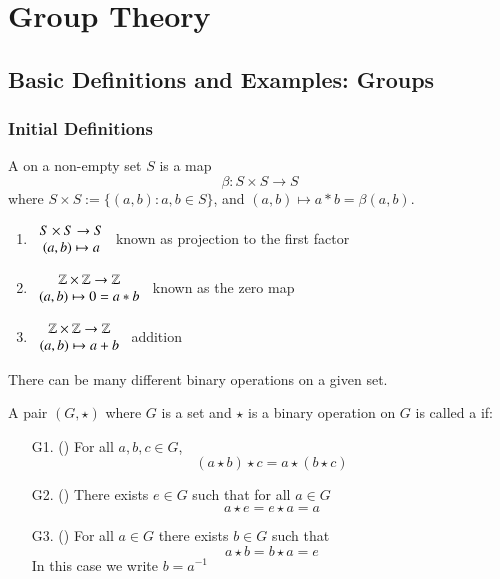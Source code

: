 \documentclass[12pt, a4paper, oneside, openright, titlepage]{book}
\begin{document}
\tableofcontents

\part{Group Theory}

\chapter{\textsection\textsection Basic Definitions and Examples: Groups}

\section{\textsection Initial Definitions}

\begin{defn}
    A  on a non-empty set $S$ is a map $$\beta:S\times S\rightarrow S$$ where $S\times S := \{(a,b): a,b \in S\}$, and $(a,b)\mapsto a*b = \beta(a,b)$.
\end{defn}

\begin{eg}
    \leavevmode
    \begin{enumerate}
        \item $\begin{array}{c} S\times S\rightarrow S \\ (a,b)\mapsto a \end{array}$ known as projection to the first factor
        \item $\begin{array}{c} \mathbb Z\times \mathbb Z\rightarrow \mathbb Z \\ (a,b)\mapsto 0 = a*b \end{array}$ known as the zero map
        \item $\begin{array}{c} \mathbb Z\times \mathbb Z\rightarrow \mathbb Z \\ (a,b)\mapsto a+b \end{array}$ addition
    \end{enumerate}
    \begin{rmk}
        There can be many different binary operations on a given set.
    \end{rmk}
\end{eg}

\begin{defn}[Group]
    A pair $(G, \star)$ where $G$ is a set and $\star$ is a binary operation on $G$ is called a  if: \begin{enumerate}
        \item[G1.] () For all $a,b,c \in G$, $$(a\star b)\star c = a\star (b\star c)$$
        \item[G2.] () There exists $e \in G$ such that for all $a \in G$ $$a\star e = e \star a = a$$
        \item[G3.] () For all $a \in G$ there exists $b \in G$ such that $$a \star b = b \star a = e$$ In this case we write $b = a^{-1}$
    \end{enumerate}
\end{defn}
\end{document}
